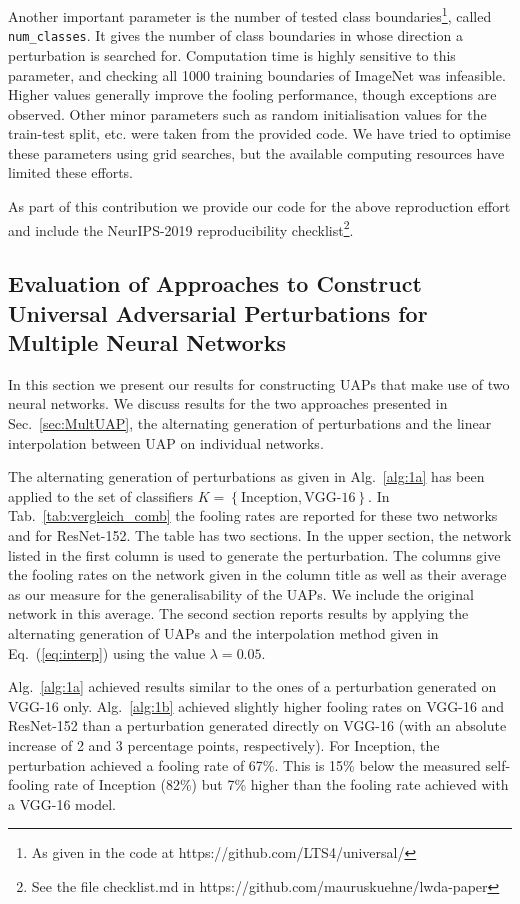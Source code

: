 \documentclass[runningheads]{llncs}
\begin{document}
Another important parameter is the number of tested class boundaries\footnote{As given in the code at https://github.com/LTS4/universal/}, called \texttt{num\_classes}. It gives the number of class boundaries in whose direction a perturbation is searched for. Computation time is highly sensitive to this parameter, and checking all 1000 training boundaries of ImageNet was infeasible. Higher values generally improve the fooling performance, though exceptions are observed. 
Other minor parameters such as random initialisation values for the train-test split, etc. were taken from the provided code. We have tried to optimise these parameters using grid searches, but the available computing resources have limited these efforts. 

As part of this contribution we provide our code for the above reproduction effort and include the NeurIPS-2019 reproducibility checklist\footnote{See the file checklist.md in https://github.com/mauruskuehne/lwda-paper}.

\subsection{Evaluation of Approaches to Construct Universal Adversarial Perturbations for Multiple Neural Networks}\label{sec:EvaluationCombined}
In this section we present our results for constructing UAPs that make use of two neural networks. We discuss results for the two approaches presented in Sec.~\ref{sec:MultUAP}, the alternating generation of perturbations and the linear interpolation between UAP on individual networks.

The alternating generation of perturbations as given in Alg.~\ref{alg:1a} has been applied to the set of classifiers \(K=\left\{\text{Inception},\text{VGG-16}\right\}\). In Tab.~\ref{tab:vergleich_comb} the fooling rates are reported for these two networks and for ResNet-152. The table has two sections. In the upper section, the network listed in the first column is used to generate the perturbation. The columns give the fooling rates on the network given in the column title as well as their average as our measure for the generalisability of the UAPs. We include the original network in this average. 
The second section reports results by applying the alternating generation of UAPs and the interpolation method given in Eq.~(\ref{eq:interp}) using the value $\lambda=0.05$. 

Alg.~\ref{alg:1a} achieved results similar to the ones of a perturbation generated on VGG-16 only. Alg.~\ref{alg:1b} achieved slightly higher fooling rates on VGG-16 and ResNet-152 than a perturbation generated directly on VGG-16 (with an absolute increase of 2 and 3 percentage points, respectively). For Inception, the perturbation achieved a fooling rate of 67\%. This is 15\% below the measured self-fooling rate of Inception (82\%) but 7\% higher than the fooling rate achieved with a VGG-16 model. 
\end{document}

